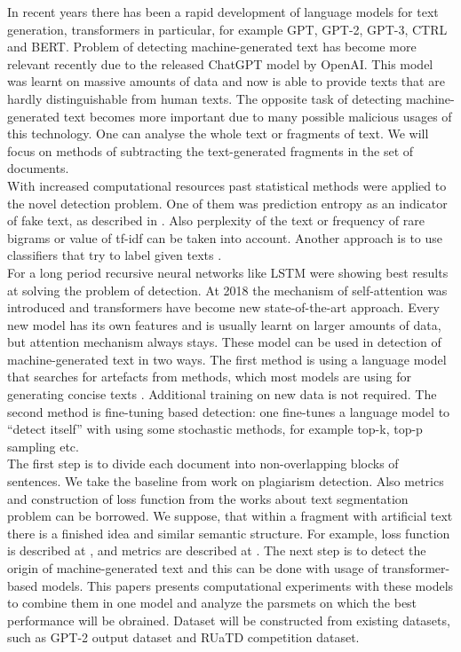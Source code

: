 \documentclass{article}
\begin{document}
In recent years there has been a rapid development of language models for text generation, transformers in particular, for example GPT\cite{gpt}, GPT-2\cite{gpt2}, GPT-3\cite{gpt3}, CTRL\cite{ctrl} and BERT\cite{bert}. Problem of detecting machine-generated text has become more relevant recently due to the released ChatGPT model by OpenAI. This model was learnt on massive amounts of data and now is able to provide texts that are hardly distinguishable from human texts. The opposite task of detecting machine-generated text becomes more important due to many possible malicious usages of this technology. One can analyse the whole text or fragments of text.
We will focus on methods of subtracting the text-generated fragments in the set of documents.\\
With increased computational resources past statistical methods were applied to the novel detection problem. One of them was prediction entropy as an indicator of fake text, as described in \cite{relativeentropy}. Also perplexity\cite{perplexity} of the text or frequency of rare bigrams \cite{rare_bigrams} or value of tf-idf \cite{solaiman} can be taken into account. Another approach is to use classifiers that try to label given texts \cite{Kuznetsov}.\\
For a long period recursive neural networks like LSTM were showing best results at solving the problem of detection. At 2018 the mechanism of self-attention\cite{Vaswani} was introduced and transformers have become new state-of-the-art approach.  Every new model has its own features and is usually learnt on larger amounts of data, but attention mechanism always stays. These model can be used in detection of machine-generated text in two ways\cite{solaiman}. The first method is using a language model that searches for artefacts from  methods, which most models are using for generating concise texts \cite{gltr}. Additional training on new data is not required. The second method is fine-tuning based detection: one fine-tunes a language model to “detect itself” with using some stochastic methods, for example top-k, top-p sampling etc.\\
The first step is to divide each document into non-overlapping blocks of sentences. We take the baseline from work\cite{Kuznetsov} on plagiarism detection. Also metrics and construction of loss function from the works about text segmentation problem can be borrowed. We suppose, that within a fragment with artificial text there is a finished idea and similar semantic structure. For example, loss function is described at \cite{ts_loss}, and metrics are described at \cite{ts_metrics}. The next step is to detect the origin of machine-generated text and this can be done with usage of transformer-based models. This papers presents computational experiments with these models to combine them in one model and analyze the parsmets on which the best performance will be obrained. Dataset will be constructed from existing datasets, such as GPT-2 output dataset\cite{gpt2-dataset} and RUaTD competition dataset\cite{ruatd-dataset}.  %
\end{document}
